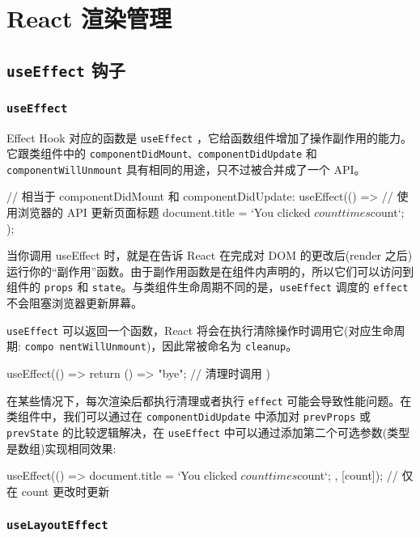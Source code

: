 \section{React 渲染管理}
\subsection{\texttt{useEffect} 钩子}

\subsubsection{\texttt{useEffect}}

Effect Hook 对应的函数是 \texttt{useEffect} ，它给函数组件增加了操作副作用的能力。它跟类组件中的 \texttt{componentDidMount、componentDidUpdate} 和 \texttt{componentWillUnmount} 具有相同的用途，只不过被合并成了一个 API。

\begin{JavaScript}
// 相当于 componentDidMount 和 componentDidUpdate:
useEffect(() => {
  // 使用浏览器的 API 更新页面标题
  document.title = `You clicked ${count} times ${count}`;
});
\end{JavaScript}

当你调用 useEffect 时，就是在告诉 React 在完成对 DOM 的更改后(render 之后)运行你的“副作用”函数。由于副作用函数是在组件内声明的，所以它们可以访问到组件的 \texttt{props} 和 \texttt{state}。与类组件生命周期不同的是，\texttt{useEffect} 调度的 \texttt{effect} 不会阻塞浏览器更新屏幕。

\texttt{useEffect} 可以返回一个函数，React 将会在执行清除操作时调用它(对应生命周期: \texttt{compo nentWillUnmount})，因此常被命名为 \texttt{cleanup}。

\begin{JavaScript}
useEffect(() => {
  return () => "bye";   // 清理时调用
})
\end{JavaScript}

在某些情况下，每次渲染后都执行清理或者执行 \texttt{effect} 可能会导致性能问题。在类组件中，我们可以通过在 \texttt{componentDidUpdate} 中添加对 \texttt{prevProps} 或 \texttt{prevState} 的比较逻辑解决，在 \texttt{useEffect} 中可以通过添加第二个可选参数(类型是数组)实现相同效果:

\begin{JavaScript}
useEffect(() => {
  document.title = `You clicked ${count} times ${count}`;
}, [count]); // 仅在 count 更改时更新
\end{JavaScript}

\subsubsection{\texttt{useLayoutEffect}}

